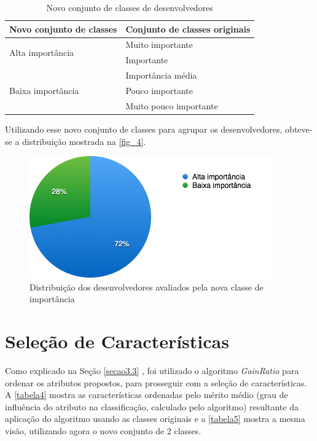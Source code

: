 
\begin{table}[h]
	\caption{Novo conjunto de classes de desenvolvedores}
	\label{tabela3}
	\def\arraystretch{1.5}
	\begin{tabular}{|p{6cm}|p{8.5cm}|}
		\hline
		\textbf{Novo conjunto de classes}  & \textbf{Conjunto de classes originais} \\ \hline
		\multirow{2}{*}{Alta importância}  & Muito importante                       \\ \cline{2-2} 
		& Importante                             \\ \hline
		\multirow{3}{*}{Baixa importância} & Importância média                      \\ \cline{2-2} 
		& Pouco importante                       \\ \cline{2-2} 
		& Muito pouco importante                 \\ \hline
	\end{tabular}
\end{table}

Utilizando esse novo conjunto de classes para agrupar os desenvolvedores, obteve-se a distribuição mostrada na \autoref{fig_4}.

\begin{figure}[h]
	\centering
	\includegraphics[scale=0.8]{figs/geral/imagem-classe-alternativa.png}
	\caption{\label{fig_4}Distribuição dos desenvolvedores avaliados pela nova classe de importância}
\end{figure}

\section{Seleção de Características}\label{secao4.3}

Como explicado na Seção \ref{secao3.3} , foi utilizado o algoritmo \textit{GainRatio} para ordenar os atributos propostos, para prosseguir com a seleção de características. A \autoref{tabela4} mostra as características ordenadas pelo mérito médio (grau de influência do atributo na classificação, calculado pelo algoritmo) resultante da aplicação do algoritmo usando as classes originais e a \autoref{tabela5} mostra a mesma visão, utilizando agora o novo conjunto de 2 classes. 

